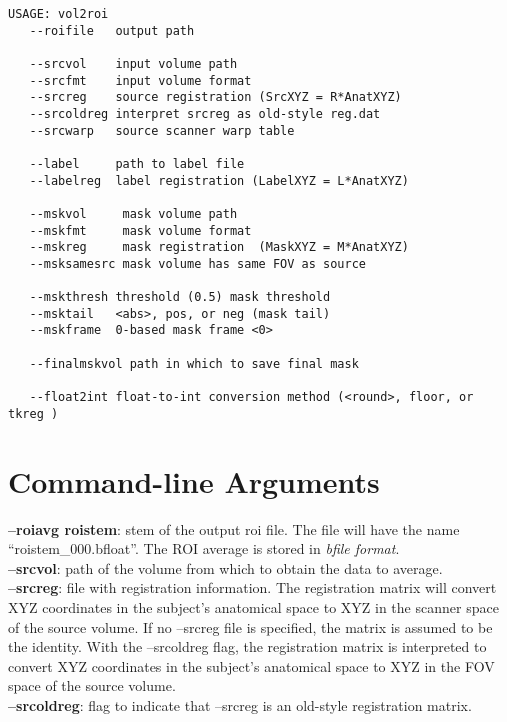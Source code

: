 \documentclass[10pt]{article}
\begin{document}
\begin{small}
\begin{verbatim}
USAGE: vol2roi
   --roifile   output path 

   --srcvol    input volume path 
   --srcfmt    input volume format 
   --srcreg    source registration (SrcXYZ = R*AnatXYZ) 
   --srcoldreg interpret srcreg as old-style reg.dat 
   --srcwarp   source scanner warp table

   --label     path to label file 
   --labelreg  label registration (LabelXYZ = L*AnatXYZ) 

   --mskvol     mask volume path 
   --mskfmt     mask volume format 
   --mskreg     mask registration  (MaskXYZ = M*AnatXYZ)
   --msksamesrc mask volume has same FOV as source 

   --mskthresh threshold (0.5) mask threshold
   --msktail   <abs>, pos, or neg (mask tail) 
   --mskframe  0-based mask frame <0> 

   --finalmskvol path in which to save final mask

   --float2int float-to-int conversion method (<round>, floor, or tkreg )
\end{verbatim}
\end{small}

\section{Command-line Arguments}

\noindent
{\bf --roiavg roistem}: stem of the output roi file. The file will have the
name ``roistem\_000.bfloat''. The ROI average is stored in {\em bfile
format}.\\ 

\noindent
{\bf --srcvol}: path of the volume from which to obtain the data to
average. \\

\noindent
{\bf --srcreg}: file with registration information.  The registration
matrix will convert XYZ coordinates in the subject's anatomical space
to XYZ in the scanner space of the source volume.  If no --srcreg file
is specified, the matrix is assumed to be the identity. With the
--srcoldreg flag, the registration matrix is interpreted to convert
XYZ coordinates in the subject's anatomical space to XYZ in the FOV
space of the source volume.\\

\noindent
{\bf --srcoldreg}: flag to indicate that --srcreg is an old-style
registration matrix.\\
\end{document}

